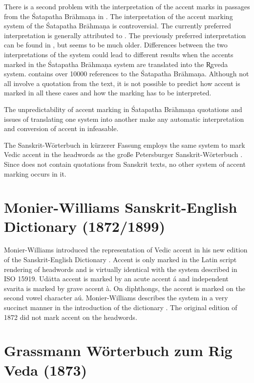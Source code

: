 There is a second problem with the interpretation of the accent marks in passages from the Śatapatha Brāhmaṇa in \citet{pwg}. The interpretation of the accent marking system of the Śatapatha Brāhmaṇa is controversial. The currently preferred interpretation is generally attributed to \citet{Hoffmann1956}. The previously preferred interpretation can be found in \citet[p.~451]{Macdonell1916}, but seems to be much older. Differences between the two interpretations of the system could lead to different results when the accents marked in the Śatapatha Brāhmaṇa system are translated into the R̥gveda system. \citet{pwg} contains over 10000 references to the Śatapatha Brāhmaṇa. Although not all involve a quotation from the text, it is not possible to predict how accent is marked in all these cases and how the marking has to be interpreted.

The unpredictability of accent marking in Śatapatha Brāhmaṇa quotations and issues of translating one system into another make any automatic interpretation and conversion of accent in \citet{pwg} infeasable. 

The Sanskrit-Wörterbuch in kürzerer Fassung \citep{pw} employs the same system to mark Vedic accent in the headwords as the große Petersburger Sanskrit-Wörterbuch \citep{pwg}. Since \citet{pw} does not contain quotations from Sanskrit texts, no other system of accent marking occurs in it.

\section{Monier-Williams Sanskrit-English Dictionary (1872/1899)}

Monier-Williams introduced the representation of Vedic accent in his new edition of the Sanskrit-English Dictionary \citep{mw}. Accent is only marked in the Latin script rendering of headwords and is virtually identical with the system described in ISO 15919. Udātta accent is marked by an acute accent á and independent svarita is marked by grave accent à. On diphthongs, the accent is marked on the second vowel character aú. Monier-Williams describes the system in a very succinct manner in the introduction of the dictionary \citep[][p.~xviii]{mw}. The original edition of 1872 \citep{mw72} did not mark accent on the headwords.

\section{Grassmann Wörterbuch zum Rig Veda (1873)}

